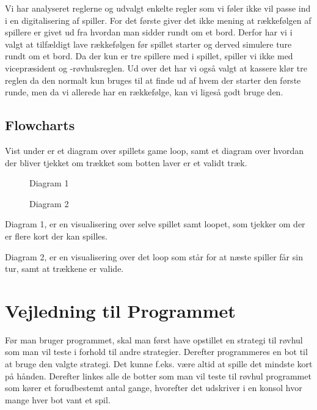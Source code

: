 \documentclass[a4paper, 12pt]{article}
\begin{document}
Vi har analyseret reglerne og udvalgt enkelte regler som vi føler ikke vil passe ind i en digitalisering af spiller. For det første giver det ikke mening at rækkefølgen af spillere er givet ud fra hvordan man sidder rundt om et bord. Derfor har vi i valgt at tilfældigt lave rækkefølgen før spillet starter og derved simulere ture rundt om et bord. Da der kun er tre spillere med i spillet, spiller vi ikke med vicepræsident og -røvhulsreglen.
Ud over det har vi også valgt at kassere klør tre reglen da den normalt kun bruges til at finde ud af hvem der starter den første runde, men da vi allerede har en rækkefølge, kan vi ligeså godt bruge den.

\vfill
\pagebreak

\subsection{Flowcharts}
Vist under er et diagram over spillets game loop, samt et diagram over hvordan der bliver tjekket om trækket som botten laver er et validt træk.
\begin{figure}[H]
    \centering
    \resizebox{.5\linewidth}{!}{}
    \caption{Diagram 1}
\end{figure}

\begin{figure}[H]
    \centering
    \resizebox{.5\linewidth}{!}{}
    \caption{Diagram 2}
\end{figure}

Diagram 1, er en visualisering over selve spillet samt loopet, som tjekker om der er flere kort der kan spilles.
\bigbreak

Diagram 2, er en visualisering over det loop som står for at næste spiller får sin tur, samt at trækkene er valide.

\section{Vejledning til Programmet}

Før man bruger programmet, skal man først have opstillet en strategi til røvhul som man vil teste i forhold til andre strategier. Derefter programmeres en bot til at bruge den valgte strategi. Det kunne f.eks. være altid at spille det mindste kort på hånden. Derefter linkes alle de botter som man vil teste til røvhul programmet som kører et forudbestemt antal gange, hvorefter det udskriver i en konsol hvor mange hver bot vant et spil.
\end{document}
